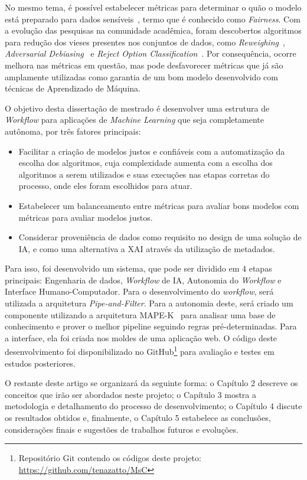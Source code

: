 \documentclass{article}
\begin{document}
No mesmo tema, é possível estabelecer métricas para determinar o quão o modelo está preparado para dados sensíveis~\citep{Begley_2021}, termo que é conhecido como \textit{Fairness}. Com a evolução das pesquisas na comunidade acadêmica, foram descobertos algoritmos para redução dos vieses presentes nos conjuntos de dados, como \textit{Reweighing}~\citep{Kamiran_2011}, \textit{Adversarial Debiasing}~\citep{Zhang_2018} e \textit{Reject Option Classification}~\citep{Kamiran_2012}. Por consequência, ocorre melhora nas métricas em questão, mas pode desfavorecer métricas que já são amplamente utilizadas como garantia de um bom modelo desenvolvido com técnicas de Aprendizado de Máquina.

O objetivo desta dissertação de mestrado é desenvolver uma estrutura de \textit{Workflow} para aplicações de \textit{Machine Learning} que seja completamente autônoma, por três fatores principais:

\begin{itemize}
\item Facilitar a criação de modelos justos e confiáveis com a automatização da escolha dos algoritmos, cuja complexidade aumenta com a escolha dos algoritmos a serem utilizados e suas execuções nas etapas corretas do processo, onde eles foram escolhidos para atuar.
\item Estabelecer um balanceamento entre métricas para avaliar bons modelos com métricas para avaliar modelos justos.
\item Considerar proveniência de dados como requisito no design de uma solução de IA, e como uma alternativa a XAI através da utilização de metadados.
\end{itemize}

Para isso, foi desenvolvido um sistema, que pode ser dividido em 4 etapas principais: Engenharia de dados, \textit{Workflow} de IA, Autonomia do \textit{Workflow} e Interface Humano-Computador. Para o desenvolvimento do \textit{workflow}, será utilizada a arquitetura \textit{Pipe-and-Filter}. Para a autonomia deste, será criado um componente utilizando a arquitetura MAPE-K~\citep{IBM_2005} para analisar uma base de conhecimento e prover o melhor pipeline seguindo regras pré-determinadas. Para a interface, ela foi criada nos moldes de uma aplicação web. O código deste desenvolvimento foi disponibilizado no GitHub\footnote{Repositório Git contendo os códigos deste projeto: \url{https://github.com/tenazatto/MsC}} para avaliação e testes em estudos posteriores.

O restante deste artigo se organizará da seguinte forma: o Capítulo 2 descreve os conceitos que irão ser abordados neste projeto; o Capítulo 3 mostra a metodologia e detalhamento do processo de desenvolvimento; o Capítulo 4 discute os resultados obtidos e, finalmente, o Capítulo 5 estabelece as conclusões, considerações finais e sugestões de trabalhos futuros e evoluções.
\end{document}
